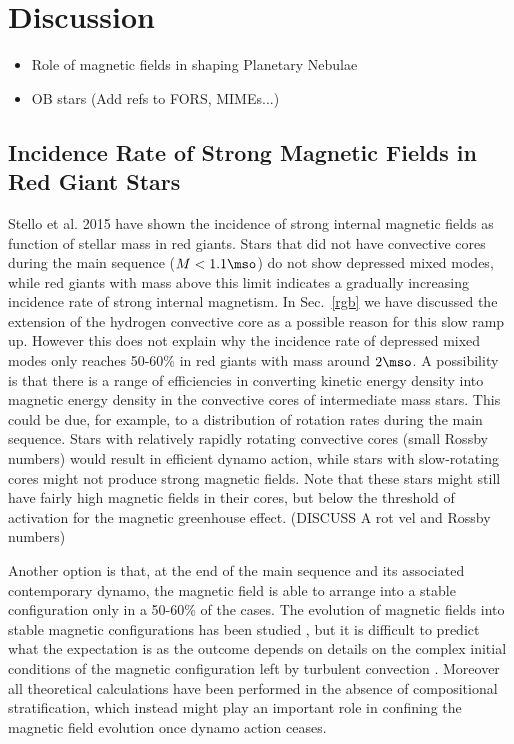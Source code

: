 \section{Discussion}
\begin{itemize}
\item Role of magnetic fields in shaping Planetary Nebulae
\item OB stars (Add refs to FORS, MIMEs...)
\end{itemize}

\subsection{Incidence Rate of Strong Magnetic Fields in Red Giant Stars}
Stello et al. 2015 have shown the incidence of strong internal magnetic fields as function of stellar mass in red giants. Stars that did not have convective cores during the main sequence ($M<1.1\mso$) do not show depressed mixed modes, while red giants with mass above this limit indicates a gradually increasing incidence rate of strong internal magnetism.    In Sec.~\ref{rgb} we have discussed the extension of the hydrogen convective core as a possible reason for this slow ramp up. However this does not explain why the incidence rate of depressed mixed modes only reaches 50-60\% in red giants with mass around $2\mso$.
A possibility is that there is a range of efficiencies in converting kinetic energy density into magnetic energy density in the convective cores of intermediate mass stars. This could be due, for example, to a distribution of rotation rates during the main sequence. Stars with relatively rapidly rotating convective cores (small Rossby numbers) would result in efficient dynamo action, while stars with slow-rotating cores might not produce strong magnetic fields. Note that these stars  might still have fairly high magnetic fields in their cores, but below the threshold of activation for the magnetic greenhouse effect.
(DISCUSS A rot vel and Rossby numbers)

Another option is that, at the end of the main sequence and its associated contemporary dynamo, the magnetic field is able to arrange into a stable configuration only in a 50-60\% of the cases. The evolution of magnetic fields into stable magnetic configurations has been studied \citep{Braithwaite_2006}, but it is difficult to predict what the expectation is as the outcome depends on details on the complex initial conditions of the magnetic configuration left by turbulent convection \citep[in particular magnetic energy and magnetic helicity][]{Braithwaite_2008}. Moreover all theoretical calculations have been performed in the absence of compositional stratification, which instead might play an important role in confining the magnetic field evolution once dynamo action ceases. 